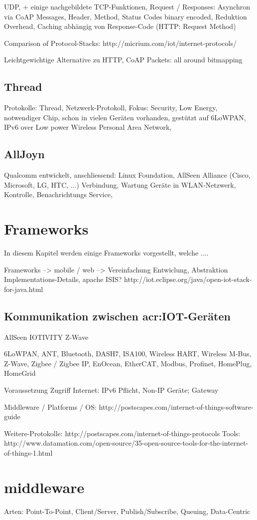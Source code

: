 UDP, + einige nachgebildete TCP-Funktionen, Request / Responses: Asynchron via CoAP Messages, Header, Method, Status Codes binary encoded, Reduktion Overhead, Caching abhängig von Response-Code (HTTP: Request Method)

Comparison of Protocol-Stacks: http://micrium.com/iot/internet-protocols/

Leichtgewichtige Alternative zu HTTP, CoAP Packets: all around bitmapping

\subsection{Thread}
Protokolle: Thread, Netzwerk-Protokoll, Fokus: Security, Low Energy, notwendiger Chip, schon in vielen Geräten vorhanden, gestützt auf 6LoWPAN, IPv6 over Low power Wireless Personal Area Network, 


\subsection{AllJoyn}
Qualcomm entwickelt, anschliessend: Linux Foundation, AllSeen Alliance (Cisco, Microsoft, LG, HTC, ...)
Verbindung, Wartung Geräte in WLAN-Netzwerk, Kontrolle, Benachrichtungs Service, 

\section{Frameworks}
In diesem Kapitel werden einige Frameworks vorgestellt, welche ....

Frameworks --> mobile / web --> Vereinfachung Entwiclung, Abstraktion Implementations-Details, 
apache ISIS?
http://iot.eclipse.org/java/open-iot-stack-for-java.html

\subsection{Kommunikation zwischen \gls{acr:IOT}-Geräten}
AllSeen
IOTIVITY
Z-Wave






6LoWPAN, ANT, Bluetooth, DASH7, ISA100, Wireless HART, Wireless M-Bus, Z-Wave, Zigbee / Zigbee IP, EnOcean, EtherCAT, Modbus, Profinet, HomePlug, HomeGrid


Voraussetzung Zugriff Internet: IPv6 Pflicht, Non-IP Geräte; Gateway


Middleware / Platforms / OS: http://postscapes.com/internet-of-things-software-guide

Weitere-Protokolle: http://postscapes.com/internet-of-things-protocols
Tools: http://www.datamation.com/open-source/35-open-source-tools-for-the-internet-of-things-1.html

\section{middleware}
Arten: Point-To-Point, Client/Server, Publish/Subscribe, Queuing, Data-Centric